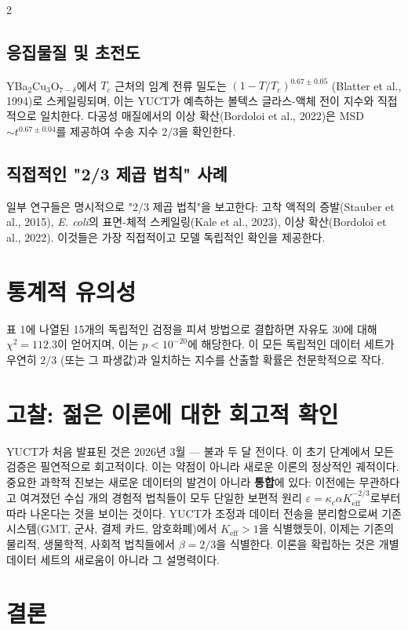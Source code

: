 \documentclass[11pt,a4paper]{article}
\begin{document}
\begin{multicols}{2}
		\subsection{응집물질 및 초전도}
		YBa\(_2\)Cu\(_3\)O\(_{7-\delta}\)에서 \(T_c\) 근처의 임계 전류 밀도는 \((1-T/T_c)^{0.67\pm0.05}\) (Blatter et al., 1994)로 스케일링되며, 이는 YUCT가 예측하는 볼텍스 글라스-액체 전이 지수와 직접적으로 일치한다. 다공성 매질에서의 이상 확산(Bordoloi et al., 2022)은 MSD \(\sim t^{0.67\pm0.04}\)를 제공하여 수송 지수 \(2/3\)을 확인한다.
		
		\subsection{직접적인 "2/3 제곱 법칙" 사례}
		일부 연구들은 명시적으로 "2/3 제곱 법칙"을 보고한다: 고착 액적의 증발(Stauber et al., 2015), \emph{E. coli}의 표면-체적 스케일링(Kale et al., 2023), 이상 확산(Bordoloi et al., 2022). 이것들은 가장 직접적이고 모델 독립적인 확인을 제공한다.
		
		\section{통계적 유의성}
		
		표 1에 나열된 15개의 독립적인 검정을 피셔 방법으로 결합하면 자유도 30에 대해 \(\chi^2 = 112.3\)이 얻어지며, 이는 \(p < 10^{-20}\)에 해당한다. 이 모든 독립적인 데이터 세트가 우연히 \(2/3\) (또는 그 파생값)과 일치하는 지수를 산출할 확률은 천문학적으로 작다.
		
		\section{고찰: 젊은 이론에 대한 회고적 확인}
		
		YUCT가 처음 발표된 것은 2026년 3월 — 불과 두 달 전이다. 이 초기 단계에서 모든 검증은 필연적으로 회고적이다. 이는 약점이 아니라 새로운 이론의 정상적인 궤적이다. 중요한 과학적 진보는 새로운 데이터의 발견이 아니라 \textbf{통합}에 있다: 이전에는 무관하다고 여겨졌던 수십 개의 경험적 법칙들이 모두 단일한 보편적 원리 \(\varepsilon = \kappa_c \alpha K_{\mathrm{eff}}^{-2/3}\)로부터 따라 나온다는 것을 보이는 것이다. YUCT가 조정과 데이터 전송을 분리함으로써 기존 시스템(GMT, 군사, 결제 카드, 암호화폐)에서 \(K_{\mathrm{eff}} > 1\)을 식별했듯이, 이제는 기존의 물리적, 생물학적, 사회적 법칙들에서 \(\beta = 2/3\)을 식별한다. 이론을 확립하는 것은 개별 데이터 세트의 새로움이 아니라 그 설명력이다.
		
		\section{결론}
		

\end{multicols}
\end{document}
